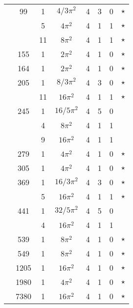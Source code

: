 \documentclass[12pt]{amsart}
\providecommand{\DIFadd}[1]{{\protect\color{blue}\uwave{#1}}} %
\providecommand{\DIFdel}[1]{{\protect\color{red}\sout{#1}}}                      %
\providecommand{\DIFaddbegin}{} %
\providecommand{\DIFaddend}{} %
\providecommand{\DIFdelbegin}{} %
\providecommand{\DIFdelend}{} %
\begin{document}
\begin{tabular}{ccc|ccccc}
 & 99 & 1 & \DIFdelbegin \DIFdel{$4/3\pi^2$ }\DIFdelend \DIFaddbegin \DIFadd{$(4/3)\pi^2$ }\DIFaddend & 4 & 3 & 0 & $\star$ \\
 &  & 5 & $4\pi^2$ & 4 & 1 & 1 & $\star$ \\
 &  & 11 & $8\pi^2$ & 4 & 1 & 1 & $\star$ \\
 & 155 & 1 & $2\pi^2$ & 4 & 1 & 0 & $\star$ \\
 & 164 & 1 & $2\pi^2$ & 4 & 1 & 0 & $\star$ \\
 & 205 & 1 & \DIFdelbegin \DIFdel{$8/3\pi^2$ }\DIFdelend \DIFaddbegin \DIFadd{$(8/3)\pi^2$ }\DIFaddend & 4 & 3 & 0 & $\star$ \\
 &  & 11 & $16\pi^2$ & 4 & 1 & 1 & $\star$ \\
 & 245 & 1 & \DIFdelbegin \DIFdel{$16/5\pi^2$ }\DIFdelend \DIFaddbegin \DIFadd{$(16/5)\pi^2$ }\DIFaddend & 4 & 5 & 0 &  \\
 &  & 4 & $8\pi^2$ & 4 & 1 & 1 &  \\
 &  & 9 & $16\pi^2$ & 4 & 1 & 1 &  \\
 & 279 & 1 & $4\pi^2$ & 4 & 1 & 0 & $\star$ \\
 & 305 & 1 & $4\pi^2$ & 4 & 1 & 0 & $\star$ \\
 & 369 & 1 & \DIFdelbegin \DIFdel{$16/3\pi^2$ }\DIFdelend \DIFaddbegin \DIFadd{$(16/3)\pi^2$ }\DIFaddend & 4 & 3 & 0 & $\star$ \\
 &  & 5 & $16\pi^2$ & 4 & 1 & 1 & $\star$ \\
 & 441 & 1 & \DIFdelbegin \DIFdel{$32/5\pi^2$ }\DIFdelend \DIFaddbegin \DIFadd{$(32/5)\pi^2$ }\DIFaddend & 4 & 5 & 0 &  \\
 &  & 4 & $16\pi^2$ & 4 & 1 & 1 &  \\
 & 539 & 1 & $8\pi^2$ & 4 & 1 & 0 & $\star$ \\
 & 549 & 1 & $8\pi^2$ & 4 & 1 & 0 & $\star$ \\
 & 1205 & 1 & $16\pi^2$ & 4 & 1 & 0 & $\star$ \\
 & 1980 & 1 & $4\pi^2$ & 4 & 1 & 0 & $\star$ \\
 & 7380 & 1 & $16\pi^2$ & 4 & 1 & 0 & $\star$ \DIFaddbegin \\
\end{tabular}
\end{document}

